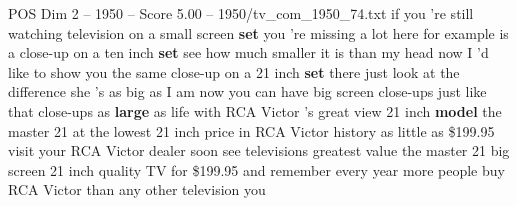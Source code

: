 \begin{textsample}{POS Dim 2 – 1950 – Score 5.00 – 1950/tv\_com\_1950\_74.txt}  \label{ex:f2_pos_006}
if you 're still watching television on a small screen \textbf{set} you 're missing a lot here for example is a close-up on a ten inch \textbf{set} see how much smaller it is than my head now I 'd like to show you the same close-up on a 21 inch \textbf{set} there just look at the difference she 's as big as I am now you can have big screen close-ups just like that close-ups as \textbf{large} as life with RCA Victor 's great view 21 inch \textbf{model} the master 21 at the lowest 21 inch price in RCA Victor history as little as \$199.95 visit your RCA Victor dealer soon see televisions greatest value the master 21 big screen 21 inch quality TV for \$199.95 and remember every year more people buy RCA Victor than any other television you

\end{textsample}
